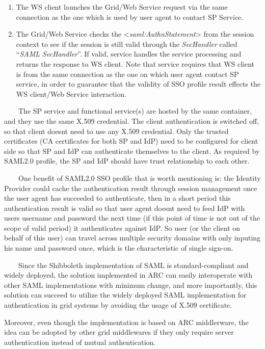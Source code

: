 \documentclass{article}
\begin{document}
\begin{enumerate}
\item The WS client launches the Grid/Web Service request via the same
connection as the one which is used by user agent to contact SP
Service.
\item The Grid/Web Service checks the
{\textless}\textit{saml:AuthnStatement}{\textgreater} from the session
context to see if the session is still valid through the
\textit{SecHandler} called {\textquotedblleft}\textit{SAML
SecHandler}{\textquotedblright}. If valid, service handles the service
processing and returns the response to WS client. Note that service
requires that WS client is from the same connection as the one on which
user agent contact SP service, in order to guarantee that the validity
of SSO profile result effects the WS client/Web Service interaction.
\end{enumerate}
\ \ \ \ The SP service and functional service(s) are hosted by the same
container, and they use the same X.509 credential. The client
authentication is switched off, so that client doesn{\textquotesingle}t
need to use any X.509 credential. Only the trusted certificates (CA
certificates for both SP and IdP) need to be configured for client side
so that SP and IdP can authenticate themselves to the client. As
required by SAML2.0 profile, the SP and IdP should have trust
relationship to each other.

\ \ \ \ One benefit of SAML2.0 SSO profile that is worth mentioning is:
the Identity Provider could cache the authentication result through
session management once the user agent has succeeded to authenticate,
then in a short period this authentication result is valid so that user
agent doesn{\textquotesingle}t need to feed IdP with
user{\textquotesingle}s username and password the next time (if this
point of time is not out of the scope of valid period) it authenticates
against IdP. So user (or the client on behalf of this user) can travel
across multiple security domains with only inputing his name and
password once, which is the characteristic of single sign-on.

\ \ \ \ Since the Shibboleth implementation of SAML is
standard-compliant and widely deployed, the solution implemented in ARC
can easily interoperate with other SAML implementations with minimum
change, and more importantly, this solution can succeed to utilize the
widely deployed SAML implementation for authentication in grid systems
by avoiding the usage of X.509 certificate.

Moreover, even though the implementation is based on ARC middlerware,
the idea can be adopted by other grid middlewares if they only require
server authentication instead of mutual authentication.
\end{document}
